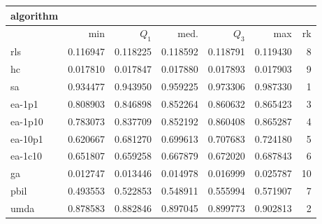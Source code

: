 \begin{tabular}{@{}l*{5}{>{{}}N{1}{3}}>{{}}N{2}{0}@{}}
\toprule
{algorithm} &  \\
\midrule
& {min} & {$Q_1$} & {med.} & {$Q_3$} & {max} & {rk}\\
\midrule
rls & 0.116947 & 0.118225 & 0.118592 & 0.118791 & 0.119430 & 8\\
hc & 0.017810 & 0.017847 & 0.017880 & 0.017893 & 0.017903 & 9\\
sa & {\color{blue}} 0.934477 & {\color{blue}} 0.943950 & {\color{blue}} 0.959225 & {\color{blue}} 0.973306 & {\color{blue}} 0.987330 & 1\\
ea-1p1 & 0.808903 & 0.846898 & 0.852264 & 0.860632 & 0.865423 & 3\\
ea-1p10 & 0.783073 & 0.837709 & 0.852192 & 0.860408 & 0.865287 & 4\\
ea-10p1 & 0.620667 & 0.681270 & 0.699613 & 0.707683 & 0.724180 & 5\\
ea-1c10 & 0.651807 & 0.659258 & 0.667879 & 0.672020 & 0.687843 & 6\\
ga & 0.012747 & 0.013446 & 0.014978 & 0.016999 & 0.025787 & 10\\
pbil & 0.493553 & 0.522853 & 0.548911 & 0.555994 & 0.571907 & 7\\
umda & 0.878583 & 0.882846 & 0.897045 & 0.899773 & 0.902813 & 2\\
\bottomrule
\end{tabular}
